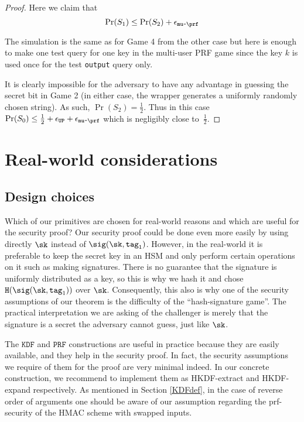 \documentclass{article}
\begin{document}
{\begin{proof}
Here we claim that
$$
\Pr(S_1) \le \Pr(S_2) + \epsilon_{\texttt{mu-}\prf}
$$

The simulation is the same as for Game 4 from the other case but here is enough to make one test query for one key in the multi-user PRF game since the key $k$ is used once for the test \texttt{output} query only.

It is clearly impossible for the adversary to have any advantage in guessing the secret bit in Game 2 (in either case, the wrapper generates a uniformly randomly chosen string). As such, $\Pr(S_2) = \frac{1}{2}$. Thus in this case $\Pr(S_0) \le \frac{1}{2} + \epsilon_{\texttt{UP}} + \epsilon_{\texttt{mu-}\prf}$ which is negligibly close to~$\frac{1}{2}$.
\end{proof}

\section{Real-world considerations} \label{sec:notes}

\subsection{Design choices}
Which of our primitives are chosen for real-world reasons and which are useful for the security proof? Our security proof could be done even more easily by using directly $\sk$ instead of $\sig(\sk, \texttt{tag}_1)$. However, in the real-world it is preferable to keep the secret key in an HSM and only perform certain operations on it such as making signatures. There is no guarantee that the signature is uniformly distributed as a key, so this is why we hash it and chose $\texttt{H}(\sig(\sk, \texttt{tag}_1))$ over $\sk$. Consequently, this also is why one of the security assumptions of our theorem is the difficulty of the ``hash-signature game''. The practical interpretation we are asking of the challenger is merely that the signature is a secret the adversary cannot guess, just like $\sk$.

The $\texttt{KDF}$ and $\texttt{PRF}$ constructions are useful in practice because they are easily available, and they help in the security proof. In fact, the security assumptions we require of them for the proof are very minimal indeed. 
In our concrete construction, we recommend to implement them as HKDF-extract and HKDF-expand respectively. As mentioned in Section \ref{KDFdef}, in the case of reverse order of arguments one should be aware of our assumption regarding the prf-security of the HMAC scheme with swapped inputs.

}
\end{document}

